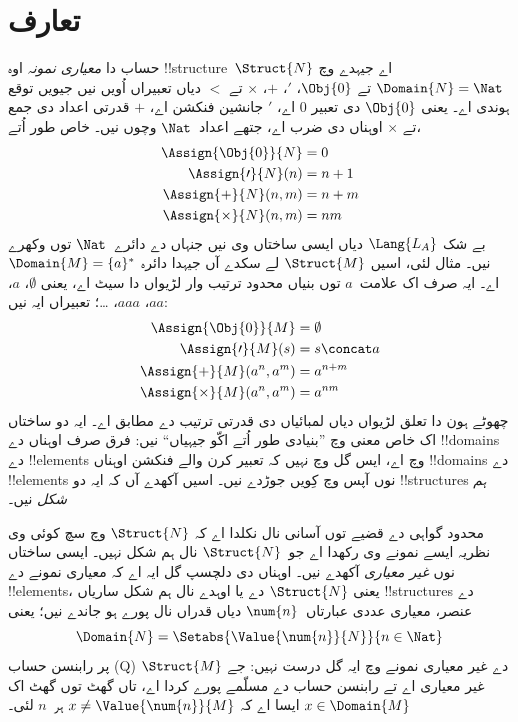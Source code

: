 \documentclass[../../../include/open-logic-section]{subfiles}
\begin{document}
\section{تعارف}

حساب دا \emph{معیاری نمونہ} اوہ
!!{structure}~$\Struct{N}$ اے جیہدے وچ $\Domain{N} = \Nat$
تے $\Obj{0}$، $\prime$، $+$، $\times$ تے $<$ دیاں تعبیراں
اُویں نیں جیویں توقع ہوندی اے۔ یعنی $\Obj{0}$ دی تعبیر $0$ اے،
$\prime$ جانشین فنکشن اے، $+$ قدرتی اعداد دی جمع تے $\times$
اوہناں دی ضرب اے، جتھے اعداد~$\Nat$ وچوں نیں۔ خاص طور اُتے،
\begin{align*}
  \Assign{\Obj{0}}{N} & = 0\\
  \Assign{\prime}{N}(n) & = n + 1\\
  \Assign{+}{N}(n, m) & = n + m\\
  \Assign{\times}{N}(n, m) & = nm
\end{align*}
بے شک $\Lang{L_A}$ دیاں ایسی ساختاں وی نیں جنہاں دے
دائرے~$\Nat$ توں وکھرے نیں۔ مثال لئی، اسیں
$\Struct{M}$ لے سکدے آں جیہدا دائرہ
$\Domain{M} = \{a\}^*$ اے۔
ایہ صرف اک علامت~$a$ توں بنیاں محدود ترتیب وار لڑیواں
دا سیٹ اے، یعنی $\emptyset$، $a$، $aa$، $aaa$، \dots؛
تعبیراں ایہ نیں:
\begin{align*}
  \Assign{\Obj{0}}{M} & = \emptyset\\
  \Assign{\prime}{M}(s) & = s \concat a\\
  \Assign{+}{M}(a^n, a^m) & = a^{n + m}\\
  \Assign{\times}{M}(a^n, a^m) & = a^{nm}
\end{align*}
چھوٹے ہون دا تعلق لڑیواں دیاں لمبائیاں دی قدرتی ترتیب دے مطابق اے۔
ایہ دو ساختاں اک خاص معنی وچ ”بنیادی طور اُتے اکّو جیہیاں“
نیں: فرق صرف اوہناں دے !!{domain}s دے !!{element}s وچ اے،
ایس گل وچ نہیں کہ تعبیر کرن والے فنکشن اوہناں !!{domain}s دے
!!{element}s نوں آپس وچ کِویں جوڑدے نیں۔ اسیں آکھدے آں کہ
ایہ دو !!{structure}s \emph{ہم شکل} نیں۔

محدود گواہی دے قضیے توں آسانی نال نکلدا اے کہ
$\Struct{N}$ وچ سچ کوئی وی نظریہ ایسے نمونے وی رکھدا اے
جو~$\Struct{N}$ نال ہم شکل نہیں۔ ایسی ساختاں نوں
\emph{غیر معیاری} آکھدے نیں۔ اوہناں دی دلچسپ گل ایہ اے کہ
معیاری نمونے دے !!{element}s، یعنی $\Struct{N}$ دے
یا اوہدے نال ہم شکل ساریاں !!{structure}s دے عنصر،
معیاری عددی عبارتاں~$\num{n}$ دیاں قدراں نال پورے ہو جاندے نیں؛
یعنی
\[
\Domain{N} = \Setabs{\Value{\num{n}}{N}}{n \in \Nat}
\]
پر رابنسن حساب (Q) دے غیر معیاری نمونے وچ ایہ گل درست نہیں:
جے $\Struct{M}$ غیر معیاری اے تے رابنسن حساب دے مسلّمے پورے کردا اے،
تاں گھٹ توں گھٹ اک
$x \in \Domain{M}$ ایسا اے کہ
$x \neq \Value{\num{n}}{M}$ ہر~$n$ لئی۔
\end{document}
